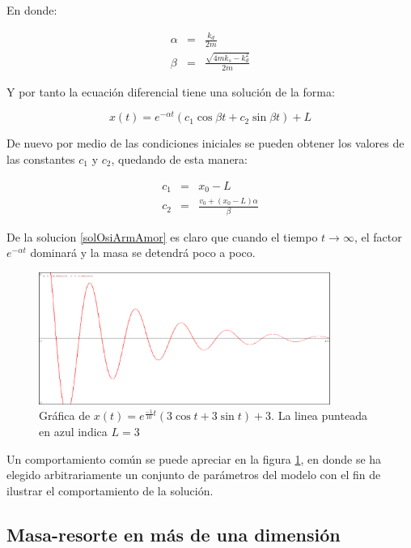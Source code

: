 En donde:

\begin{eqnarray}
\alpha & = & \frac{k_d}{2m} \nonumber \\
\beta  & = & \frac{\sqrt{4 m k_s - k_d^2}}{2m} \nonumber
\end{eqnarray}

Y por tanto la ecuación diferencial tiene una solución de la forma:

\begin{equation}
\label{solOsiArmAmor} 
x(t) = e^{-\alpha t} \left( c_1 \cos{\beta t} + c_2 \sin{\beta t} \right) + L
\end{equation}

De nuevo por medio de las condiciones iniciales se pueden obtener los valores de las constantes $c_1$ y $c_2$, quedando de esta manera:

\begin{eqnarray}
c_1 & = & x_0 - L \nonumber \\
c_2 & = & \frac{v_0 + \left( x_0 - L \right) \alpha }{\beta } \nonumber 
\end{eqnarray}

De la solucion \ref{solOsiArmAmor} es claro que cuando el tiempo $t \rightarrow \infty $, el factor $e^{-\alpha t}$ dominará y la masa se detendrá poco a poco.

\begin{figure}
 \centering
 \includegraphics[width=0.85\textwidth]{Img/oscilador_amortiguado}
 \caption[Plano fase del oscilador armónico amortiguado]{ 
 Gráfica de $x(t) = e^{\frac{-1}{10}t} \left( 3 \cos{t} + 3 \sin{t} \right) + 3$. La linea punteada en azul indica $L = 3$
 } \label{OsciAmor:fig}
\end{figure}


Un comportamiento común se puede apreciar en la figura \ref{OsciAmor:fig}, en donde se ha elegido arbitrariamente un conjunto de parámetros del modelo con el fin de ilustrar el comportamiento de la solución.

\subsection{Masa-resorte en más de una dimensión}

